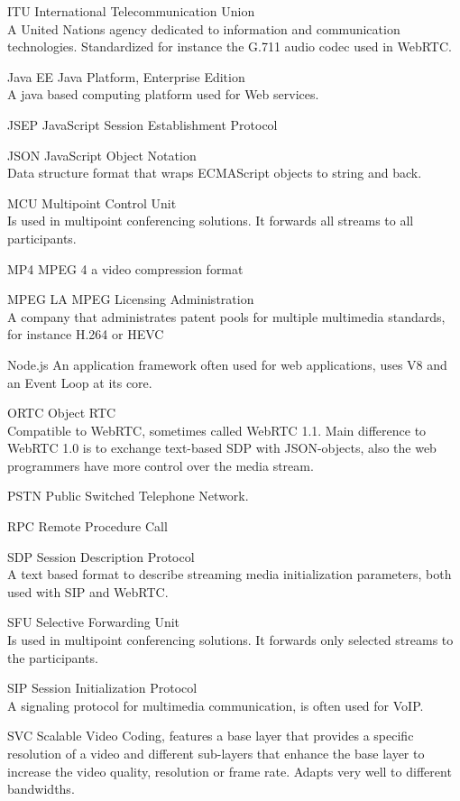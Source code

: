 \documentclass[../thesis.tex]{subfiles}
\begin{document}
\begin{abbreviations}
\item[ITU] International Telecommunication Union \\A United Nations agency dedicated to information and communication technologies. Standardized for instance the G.711 audio codec\cite{g.x} used in WebRTC.
\item[Java EE] Java Platform, Enterprise Edition \\A java based computing platform used for Web services.
\item[JSEP] JavaScript Session Establishment Protocol
\item[JSON] JavaScript Object Notation \\Data structure format that wraps ECMAScript objects to string and back.
\item[MCU] Multipoint Control Unit \\Is used in multipoint conferencing solutions. It forwards all streams to all participants.
\item[MP4] MPEG 4 a video compression format
\item[MPEG LA] MPEG Licensing Administration \\A company that administrates patent pools for multiple multimedia standards, for instance H.264 or HEVC
\item[Node.js] An application framework often used for web applications, uses V8 and an Event Loop at its core.
\item[ORTC] Object RTC \\Compatible to WebRTC, sometimes called WebRTC 1.1. Main difference to WebRTC 1.0 is to exchange text-based SDP with JSON-objects, also the web programmers have more control over the media stream.
\item[PSTN] Public Switched Telephone Network.
\item[RPC] Remote Procedure Call
\item[SDP] Session Description Protocol \\A text based format to describe streaming media initialization parameters, both used with SIP and WebRTC.
\item[SFU] Selective Forwarding Unit \\Is used in multipoint conferencing solutions. It forwards only selected streams to the participants.
\item[SIP] Session Initialization Protocol \\A signaling protocol for multimedia communication, is often used for VoIP.
\item[SVC] Scalable Video Coding, features a base layer that provides a specific resolution of a video and different sub-layers that enhance the base layer to increase the video quality, resolution or frame rate. Adapts very well to different bandwidths.

\end{abbreviations}
\end{document}
